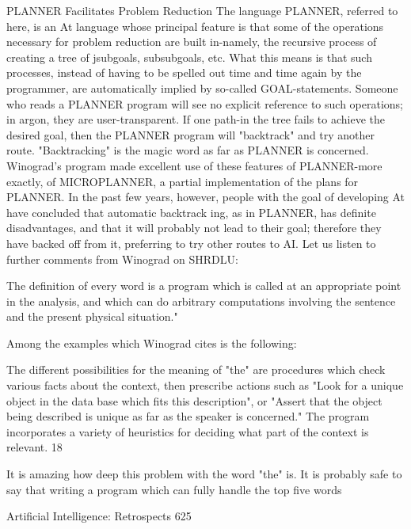 {                   PLANNER Facilitates Problem Reduction
The language PLANNER, referred to here, is an At language whose principal feature is
that some of the operations necessary for problem reduction are built in-namely, the
recursive process of creating a tree of jsubgoals, subsubgoals, etc. What this means is that
such processes, instead of having to be spelled out time and time again by the
programmer, are automatically implied by so-called GOAL-statements. Someone who
reads a PLANNER program will see no explicit reference to such operations; in argon,
they are user-transparent. If one path-in the tree fails to achieve the desired goal, then the
PLANNER program will "backtrack" and try another route. "Backtracking" is the magic
word as far as PLANNER is concerned.
        Winograd's program made excellent use of these features of PLANNER-more
exactly, of MICROPLANNER, a partial implementation of the plans for PLANNER. In
the past few years, however, people with the goal of developing At have concluded that
automatic backtrack ing, as in PLANNER, has definite disadvantages, and that it will
probably not lead to their goal; therefore they have backed off from it, preferring to try
other routes to AI.
        Let us listen to further comments from Winograd on SHRDLU:

   The definition of every word is a program which is called at an appropriate point in
   the analysis, and which can do arbitrary computations involving the sentence and
   the present physical situation."

Among the examples which Winograd cites is the following:

   The different possibilities for the meaning of "the" are procedures which check
   various facts about the context, then prescribe actions such as "Look for a unique
   object in the data base which fits this description", or "Assert that the object being
   described is unique as far as the speaker is concerned." The program incorporates a
   variety of heuristics for deciding what part of the context is relevant. 18

It is amazing how deep this problem with the word "the" is. It is probably safe to say that
writing a program which can fully handle the top five words

Artificial Intelligence: Retrospects                                                      625

}
